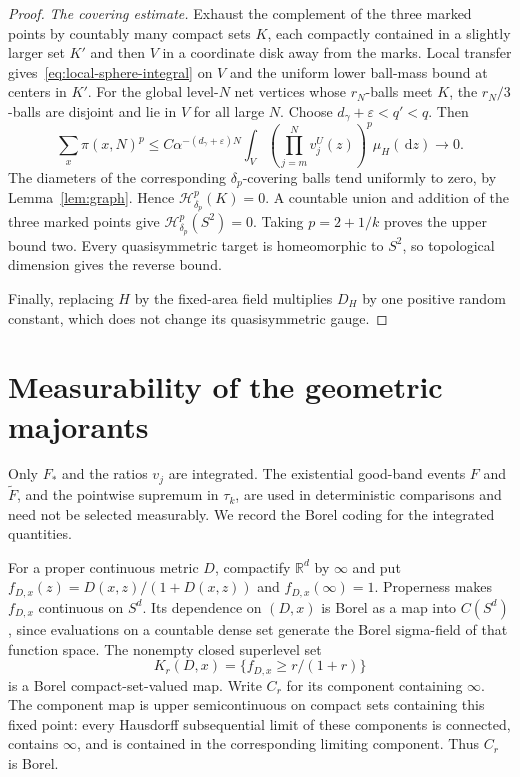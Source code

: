 \documentclass[11pt,reqno]{amsart}
\theoremstyle{plain}
\theoremstyle{definition}
\theoremstyle{remark}
\newcommand{\R}{\mathbb R}
\newcommand{\Hh}{\mathcal H}
\newcommand{\1}{\mathbf{1}}
\newcommand{\dd}{\,\mathrm d}
\begin{document}
\begin{proof}
\emph{The covering estimate.} Exhaust the complement of the three marked points by countably many compact sets $K$, each compactly contained in a slightly larger set $K'$ and then $V$ in a coordinate disk away from the marks. Local transfer gives~\eqref{eq:local-sphere-integral} on $V$ and the uniform lower ball-mass bound at centers in $K'$. For the global level-$N$ net vertices whose $r_N$-balls meet $K$, the $r_N/3$-balls are disjoint and lie in $V$ for all large $N$. Choose $d_\gamma+\varepsilon<q'<q$. Then
\begin{equation*}
\sum_x\pi(x,N)^p
\le C\alpha^{-(d_\gamma+\varepsilon)N}
\int_V\left(\prod_{j=m}^Nv_j^U(z)\right)^p\mu_H(\dd z)
\longrightarrow0.
\end{equation*}
The diameters of the corresponding $\delta_p$-covering balls tend uniformly to zero, by Lemma~\ref{lem:graph}. Hence $\Hh^p_{\delta_p}(K)=0$. A countable union and addition of the three marked points give $\Hh^p_{\delta_p}(S^2)=0$. Taking $p=2+1/k$ proves the upper bound two. Every quasisymmetric target is homeomorphic to $S^2$, so topological dimension gives the reverse bound.

Finally, replacing $H$ by the fixed-area field multiplies $D_H$ by one positive random constant, which does not change its quasisymmetric gauge.
\end{proof}

\appendix
\section{Measurability of the geometric majorants}\label{app:measurable}
Only $F_*$ and the ratios $v_j$ are integrated. The existential good-band events $F$ and $\widetilde F$, and the pointwise supremum in $\tau_k$, are used in deterministic comparisons and need not be selected measurably. We record the Borel coding for the integrated quantities.

For a proper continuous metric $D$, compactify $\R^d$ by $\infty$ and put $f_{D,x}(z)=D(x,z)/(1+D(x,z))$ and $f_{D,x}(\infty)=1$. Properness makes $f_{D,x}$ continuous on $S^d$. Its dependence on $(D,x)$ is Borel as a map into $C(S^d)$, since evaluations on a countable dense set generate the Borel sigma-field of that function space. The nonempty closed superlevel set
\begin{equation*}
K_r(D,x)=\{f_{D,x}\ge r/(1+r)\}
\end{equation*}
is a Borel compact-set-valued map. Write $C_r$ for its component containing $\infty$. The component map is upper semicontinuous on compact sets containing this fixed point: every Hausdorff subsequential limit of these components is connected, contains $\infty$, and is contained in the corresponding limiting component. Thus $C_r$ is Borel.
\end{document}
